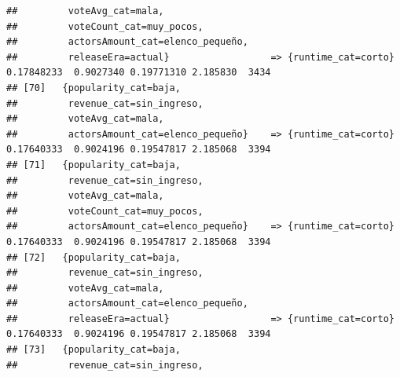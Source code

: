 \documentclass[
]{article}
\begin{document}
\begin{verbatim}
##         voteAvg_cat=mala,                                                                                                       
##         voteCount_cat=muy_pocos,                                                                                                
##         actorsAmount_cat=elenco_pequeño,                                                                                        
##         releaseEra=actual}                  => {runtime_cat=corto}               0.17848233  0.9027340 0.19771310 2.185830  3434
## [70]   {popularity_cat=baja,                                                                                                    
##         revenue_cat=sin_ingreso,                                                                                                
##         voteAvg_cat=mala,                                                                                                       
##         actorsAmount_cat=elenco_pequeño}    => {runtime_cat=corto}               0.17640333  0.9024196 0.19547817 2.185068  3394
## [71]   {popularity_cat=baja,                                                                                                    
##         revenue_cat=sin_ingreso,                                                                                                
##         voteAvg_cat=mala,                                                                                                       
##         voteCount_cat=muy_pocos,                                                                                                
##         actorsAmount_cat=elenco_pequeño}    => {runtime_cat=corto}               0.17640333  0.9024196 0.19547817 2.185068  3394
## [72]   {popularity_cat=baja,                                                                                                    
##         revenue_cat=sin_ingreso,                                                                                                
##         voteAvg_cat=mala,                                                                                                       
##         actorsAmount_cat=elenco_pequeño,                                                                                        
##         releaseEra=actual}                  => {runtime_cat=corto}               0.17640333  0.9024196 0.19547817 2.185068  3394
## [73]   {popularity_cat=baja,                                                                                                    
##         revenue_cat=sin_ingreso,                                                                                                

\end{verbatim}
\end{document}
